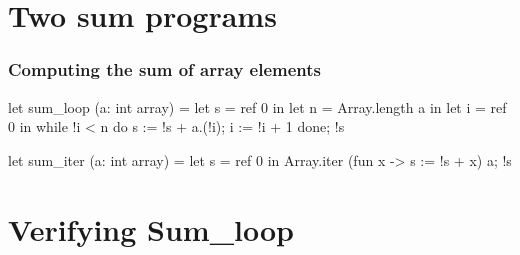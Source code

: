 \documentclass[xcolor=dvipsnames]{beamer}
\begin{document}
\section*{Two sum programs}
\begin{frame}[fragile]\frametitle{Computing the sum of array elements}
\begin{adjustwidth}{-0.3cm}{1.0cm}
\begin{small}
\begin{minipage}[t]{0.4\textwidth}
\begin{whycode}  
let sum_loop (a: int array)
= let s = ref 0 in
  let n = Array.length a in
  let i = ref 0 in
  while !i < n do
    s := !s + a.(!i);
    i := !i + 1
  done;
  !s
\end{whycode}
\end{minipage}\hfill
\begin{minipage}[t]{0.4\textwidth}
\begin{whycode} 
let sum_iter (a: int array)
= let s = ref 0 in
  Array.iter 
    (fun x -> s := !s + x) a;
  !s
\end{whycode}	
\end{minipage}
\end{small}
\end{adjustwidth}
\end{frame}

\section*{Verifying Sum_loop}
\newcommand{\OliveGreen}[1]{\textcolor{OliveGreen}{#1}}
\newcommand{\Rouge}[1]{\textcolor{red}{#1}}
\newcommand{\Noir}[1]{\textcolor{black}{#1}}
\end{document}
